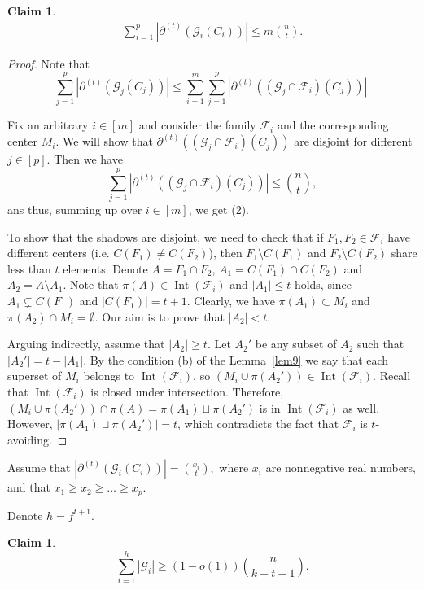 \documentclass[12pt,a4paper]{article}
\newcommand{\ff}{\mathcal{F}}
\newtheorem{Claim}[Theorem]{Claim}
\begin{document}
\begin{Claim}\label{cla13}
    \begin{align}
       \sum_{i=1}^p |\partial^{(t)}(\mathcal{G}_i(C_i))| \leqslant m \binom{n}{t}.
    \end{align}  
\end{Claim}

\begin{proof}

Note that
$$\sum_{j=1}^p |\partial^{(t)}(\mathcal{G}_j(C_j))| \leqslant \sum_{i=1}^m \sum_{j=1}^p |\partial^{(t)}((\mathcal{G}_j \cap \ff_i)(C_j))|.$$

Fix an arbitrary $i \in [m]$ and consider the family $\ff_i$ and the corresponding center $M_i$. We will show that $\partial^{(t)}((\mathcal{G}_j \cap \ff_i)(C_j))$ are disjoint for different $j \in [p]$. Then we have
$$ \sum_{j=1}^p|\partial^{(t)}((\mathcal{G}_j \cap \ff_i)(C_j))| \leqslant \binom{n}{t},$$
ans thus, summing up over $i \in [m]$, we get (2).

To show that the shadows are disjoint, we need to check that if $F_1, F_2 \in \mathcal{F}_i$ have different centers (i.e. $C(F_1) \neq C(F_2)$), then $F_1 \setminus C(F_1)$ and $F_2 \setminus C(F_2)$ share less than $t$ elements. Denote $A = F_1 \cap F_2$, $A_1 = C(F_1) \cap C(F_2)$ and $A_2 = A \setminus A_1$. Note that $\pi(A) \in \operatorname{Int}(\mathcal{F}_i)$ and $|A_1| \leqslant t$ holds, since $A_1 \subsetneq C(F_1)$ and $|C(F_1)|=t+1$. Clearly, we have $\pi(A_1) \subset M_i$ and $\pi(A_2) \cap M_i = \emptyset$. Our aim is to prove that $|A_2| < t$. 

Arguing indirectly, assume that $|A_2| \geqslant t$. Let $A_2'$ be any subset of $A_2$ such that $|A_2'|= t - |A_1|.$ By the condition (b) of the Lemma~\ref{lem9} we say that each superset of $M_i$ belongs to $\operatorname{Int}(\mathcal{F}_i)$, so $(M_i \cup \pi(A_2')) \in \operatorname{Int}(\mathcal{F}_i)$. Recall that $\operatorname{Int}(\mathcal{F}_i)$ is closed under intersection. Therefore, $(M_i \cup \pi(A_2')) \cap \pi(A) = \pi(A_1) \sqcup \pi(A_2')$ is in $\operatorname{Int}(\mathcal{F}_i)$ as well. However, $|\pi(A_1) \sqcup \pi(A_2')| = t$, which contradicts the fact that $\mathcal{F}_i$ is $t$-avoiding.  
\end{proof}


Assume that $|\partial^{(t)}(\mathcal{G}_i(C_i))| = \binom{x_i}{t},$ where $x_i$ are nonnegative real numbers, and that $x_1 \geqslant x_2 \geqslant \ldots \geqslant x_p.$

Denote $h=f^{t+1}$.
\begin{Claim}\label{cla14}
    $$\sum_{i=1}^h |\mathcal{G}_i| \geqslant (1 - o(1) )  \binom{n}{k-t-1}.$$
\end{Claim}
\end{document}
